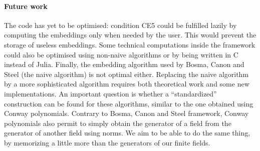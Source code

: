 \documentclass[12pt]{article}
\begin{document}
\paragraph{Future work}

The code has yet to be optimised: condition CE5 could be fulfilled lazily by
computing the embeddings only when needed by the user. This would prevent the
storage of useless embeddings. Some technical computations inside the framework could also be optimised
using non-naive algorithms or by being written in C instead of Julia. Finally,
the embedding algorithm used by Bosma,
Canon and Steel (the naive algorithm) is not optimal either. Replacing the naive
algorithm by a more sophisticated algorithm requires both theoretical work and some
new implementations. An important question is whether a ``standardized''
construction can be found for these algorithms, similar to the one obtained
using Conway polynomials. Contrary to Bosma, Canon and Steel framework, Conway
polynomials also permit to simply obtain the generator of a field from the
generator of another field using norms. We aim to be able to do the same thing,
by memorizing a little more than the generators of our finite fields.



\end{document}
